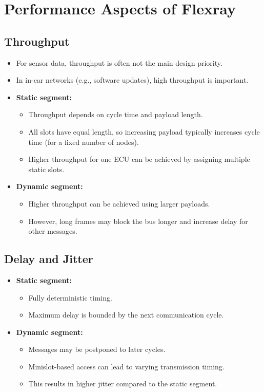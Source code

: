 \section{Performance Aspects of Flexray}

\subsection*{Throughput}

\begin{itemize}
    \item For sensor data, throughput is often not the main design priority.
    
    \item In in-car networks (e.g., software updates), high throughput is important.
    
    \item \textbf{Static segment:}
    \begin{itemize}
        \item Throughput depends on cycle time and payload length.
        \item All slots have equal length, so increasing payload typically increases cycle time (for a fixed number of nodes).
        \item Higher throughput for one ECU can be achieved by assigning multiple static slots.
    \end{itemize}
    
    \item \textbf{Dynamic segment:}
    \begin{itemize}
        \item Higher throughput can be achieved using larger payloads.
        \item However, long frames may block the bus longer and increase delay for other messages.
    \end{itemize}
\end{itemize}

\subsection*{Delay and Jitter}

\begin{itemize}
    \item \textbf{Static segment:}
    \begin{itemize}
        \item Fully deterministic timing.
        \item Maximum delay is bounded by the next communication cycle.
    \end{itemize}
    
    \item \textbf{Dynamic segment:}
    \begin{itemize}
        \item Messages may be postponed to later cycles.
        \item Minislot-based access can lead to varying transmission timing.
        \item This results in higher jitter compared to the static segment.
    \end{itemize}
\end{itemize}

